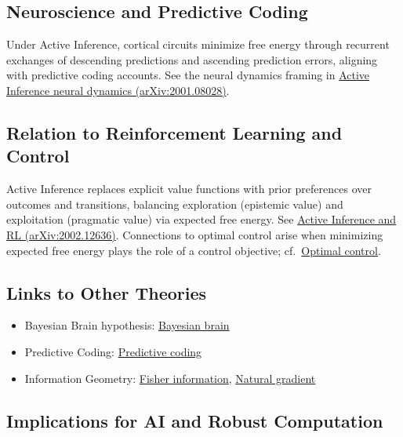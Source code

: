 \documentclass[
  10pt,
]{article}
\providecommand{\tightlist}{%
  \setlength{\itemsep}{0pt}\setlength{\parskip}{0pt}}
\begin{document}
\hypertarget{neuroscience-and-predictive-coding}{%
\subsection{Neuroscience and Predictive
Coding}\label{neuroscience-and-predictive-coding}}

Under Active Inference, cortical circuits minimize free energy through
recurrent exchanges of descending predictions and ascending prediction
errors, aligning with predictive coding accounts. See the neural
dynamics framing in \href{https://arxiv.org/abs/2001.08028}{Active
Inference neural dynamics (arXiv:2001.08028)}.

\hypertarget{relation-to-reinforcement-learning-and-control}{%
\subsection{Relation to Reinforcement Learning and
Control}\label{relation-to-reinforcement-learning-and-control}}

Active Inference replaces explicit value functions with prior
preferences over outcomes and transitions, balancing exploration
(epistemic value) and exploitation (pragmatic value) via expected free
energy. See \href{https://arxiv.org/abs/2002.12636}{Active Inference and
RL (arXiv:2002.12636)}. Connections to optimal control arise when
minimizing expected free energy plays the role of a control objective;
cf.~\href{https://en.wikipedia.org/wiki/Optimal_control}{Optimal
control}.

\hypertarget{links-to-other-theories}{%
\subsection{Links to Other Theories}\label{links-to-other-theories}}

\begin{itemize}
\tightlist
\item
  Bayesian Brain hypothesis:
  \href{https://en.wikipedia.org/wiki/Bayesian_brain}{Bayesian brain}
\item
  Predictive Coding:
  \href{https://en.wikipedia.org/wiki/Predictive_coding}{Predictive
  coding}
\item
  Information Geometry:
  \href{https://en.wikipedia.org/wiki/Fisher_information}{Fisher
  information},
  \href{https://en.wikipedia.org/wiki/Natural_gradient}{Natural
  gradient}
\end{itemize}

\hypertarget{implications-for-ai-and-robust-computation}{%
\subsection{Implications for AI and Robust
Computation}\label{implications-for-ai-and-robust-computation}}
\end{document}
